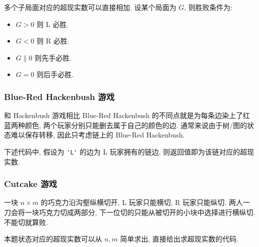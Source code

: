 多个子局面对应的超现实数可以直接相加. 设某个局面为 $G$, 则胜败条件为:

\begin{itemize}
  \item $G>0$ 则 L 必胜.
  \item $G<0$ 则 R 必胜.
  \item $G\parallel0$ 则先手必胜.
  \item $G=0$ 则后手必胜.
\end{itemize}

\subsubsection{Blue-Red Hackenbush 游戏}
和 Hackenbush 游戏相比 Blue-Red Hackenbush 的不同点就是为每条边染上了红蓝两种颜色, 两个玩家分别只能删去属于自己的颜色的边. 通常来说由于树/图的状态难以保存转移, 因此只考虑链上的 Blue-Red Hackenbush.

下述代码中, 假设为 \lstinline{'L'} 的边为 L 玩家拥有的链边, 则返回值即为该链对应的超现实数.



\subsubsection{Cutcake 游戏}
一块 $n\times m$ 的巧克力沿沟壑纵横切开, L 玩家只能横切, R 玩家只能纵切. 两人一刀会将一块巧克力切成两部分, 下一位切的只能从被切开的小块中选择进行横纵切. 不能切就算败.

本题状态对应的超现实数可以从 $n,m$ 简单求出, 直接给出求超现实数的代码.


